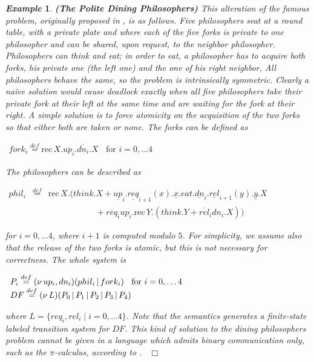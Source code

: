 \documentclass[submission,copyright,creativecommons]{eptcs}
\newcommand{\fine}{{\mbox{ }\nolinebreak\hfill{$\Box$}}}
\newcommand{\eqdef}{{\mbox{${\stackrel{def}{=}}$}}}
\newcommand{\restr}[1]{\mbox{$({\bf\nu} #1)$}}
\newcommand{\para}{\mbox{$\,|\,$}}
\newcommand{\recx}[1]{\mbox{rec$\, X.#1$}}
\newcommand{\rec}[2]{\mbox{rec}\, #1.#2}
\newtheorem{aexample}{\it Example}
\newenvironment{example}{\begin{aexample} }{\end{aexample}}
\begin{document}
\begin{example}\label{ex-polite}
{\bf(The Polite Dining Philosophers)} This alteration of the famous problem, originally proposed
in \cite{Dij71}, is as follows.
Five philosophers seat at a round table, with a private plate and where each of the five forks is private to one
philosopher and can be shared, upon request, to the neighbor philosopher.
Philosophers can think and eat; in order to eat, a philosopher has to acquire both forks, his 
private one (the left one) and the one of his right neighbor,
All philosophers behave the same, so the problem is intrinsically symmetric.
Clearly a na\"ive solution would cause deadlock exactly when all five philosophers take their private fork 
at their left at the same time and are waiting for the fork at their right.
A simple solution is to force atomicity on the acquisition of the two forks so that either both are taken or none. 
The forks can be defined as

$
\begin{array}{lll}
fork_i \eqdef  \recx { \overline{up_i}.\overline{dn_i}.X} \; \;  \mbox{   for  }i = 0, \ldots 4  
\end{array}
$

\noindent
The philosophers can be described as 

$
\begin{array}{lll}
phil_i &  \eqdef & \recx (think.X 
 + \underline{up}_i.\underline{req}_{i+1}(x).\underline{x}.eat.\underline{dn}_{i}.\underline{rel}_{i+1}(y).\underline{y}.X \\
&& \; \; \;  \hspace{2cm} + \overline{req}_i up_i. \rec Y (think.Y +  \overline{rel}_i dn_i.X))
\end{array}
$

\noindent
for  $i = 0, \ldots 4$, where $i+1$ is computed modulo $5$. 
For simplicity,
we assume also that the release of the two forks is atomic, but this is not necessary for correctness.
The whole system is 

$
\begin{array}{lll}
P_i \;  \eqdef \;  \restr{\, up_i, dn_i}(phil_i \para fork_i)   \; \;  \mbox{   for  }i = 0, \ldots 4 \\
DF \;  \eqdef \;  \restr{\,L}(P_0 \para P_1 \para P_2 \para P_3 \para P_4) 

\end{array}
$

\noindent
where $L = \{req_i, rel_i \mid i = 0, \ldots 4 \}$. Note that the semantics generates 
a finite-state labeled transition system for $DF$. 
This kind of solution
to the dining philosophers problem cannot be given in a language which admits binary communication only,
such as the $\pi$-calculus, according to \cite{LR81,LV10}.
\fine
\end{example}
\end{document}
